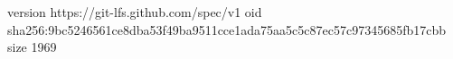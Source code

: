 version https://git-lfs.github.com/spec/v1
oid sha256:9bc5246561ce8dba53f49ba9511cce1ada75aa5c5c87ec57c97345685fb17cbb
size 1969
